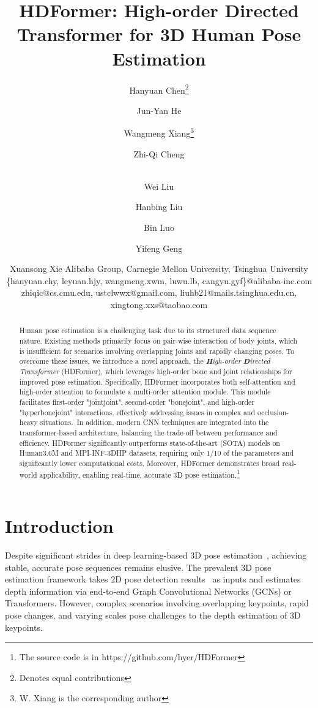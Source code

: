 \documentclass{article}
\title{HDFormer: High-order Directed Transformer for 3D Human Pose Estimation}
\author{
Hanyuan Chen\thanks{Denotes equal contributions}\and
Jun-Yan He\and
Wangmeng Xiang\thanks{W. Xiang is the corresponding author}\and
Zhi-Qi Cheng\and \\
Wei Liu\and
Hanbing Liu\and
Bin Luo\and
Yifeng Geng\and
Xuansong Xie
\affiliations
Alibaba Group, \quad
Carnegie Mellon University, \quad
Tsinghua University
\emails
\{hanyuan.chy, leyuan.hjy, wangmeng.xwm, luwu.lb, cangyu.gyf\}@alibaba-inc.com \\
 zhiqic@cs.cmu.edu, ustclwwx@gmail.com, liuhb21@mails.tsinghua.edu.cn, xingtong.xxs@taobao.com 
 }
\begin{document}
\maketitle


\begin{abstract}
Human pose estimation is a challenging task due to its structured data sequence nature. Existing methods primarily focus on pair-wise interaction of body joints, which is insufficient for scenarios involving overlapping joints and rapidly changing poses. To overcome these issues, we introduce a novel approach, the \textit{\textbf{H}igh-order} \textit{\textbf{D}irected} \textit{Transformer} (HDFormer), which leverages high-order bone and joint relationships for improved pose estimation. Specifically, HDFormer incorporates both self-attention and high-order attention to formulate a multi-order attention module. This module facilitates first-order "jointjoint", second-order "bonejoint", and high-order "hyperbonejoint" interactions, effectively addressing issues in complex and occlusion-heavy situations.~In addition, modern CNN techniques are integrated into the transformer-based architecture, balancing the trade-off between performance and efficiency. HDFormer significantly outperforms state-of-the-art (SOTA) models on Human3.6M and MPI-INF-3DHP datasets, requiring only 1/10 of the parameters and significantly lower computational costs. Moreover, HDFormer demonstrates broad real-world applicability, enabling real-time, accurate 3D pose estimation.\footnote{The source code is in https://github.com/hyer/HDFormer}
\end{abstract}





\section{Introduction}
Despite significant strides in deep learning-based 3D pose estimation~\cite{Iskakov_2019_ICCV,Qiu_2019_ICCV,pavllo2019-3d,li2020-cascaded,zhu2021-posegtac,2021PoseAug,ye2022-faster}, achieving stable, accurate pose sequences remains elusive. The prevalent 3D pose estimation framework takes 2D pose detection results~\cite{Chen2018CPN,SunXLW19} as inputs and estimates depth information via end-to-end Graph Convolutional Networks (GCNs)\cite{cai2019-exploiting,pavllo2019-3d} or Transformers\cite{ZhangCVPR22MixSTE}. However, complex scenarios involving overlapping keypoints, rapid pose changes, and varying scales pose challenges to the depth estimation of 3D keypoints.
\end{document}
